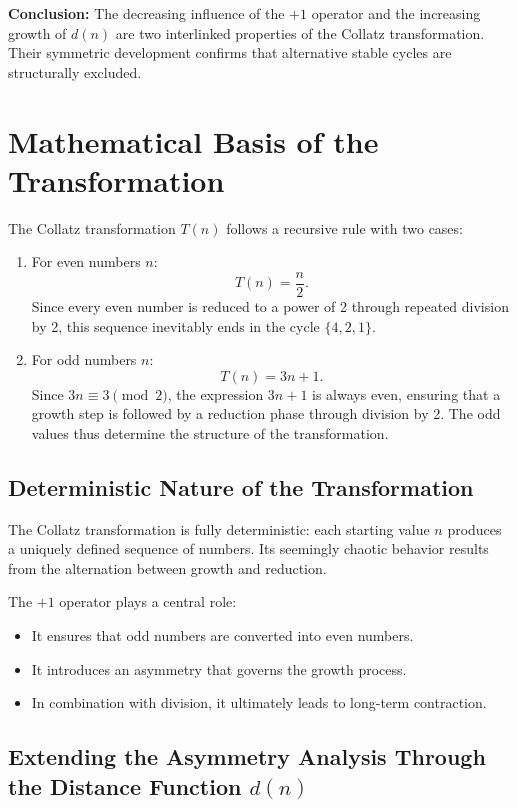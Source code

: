 \documentclass[a4paper,12pt]{article}
\begin{document}
\textbf{Conclusion:} The decreasing influence of the \( +1 \) operator and the increasing growth of \( d(n) \) are two interlinked properties of the Collatz transformation. Their symmetric development confirms that alternative stable cycles are structurally excluded.



\section{Mathematical Basis of the Transformation}

The Collatz transformation \( T(n) \) follows a recursive rule with two cases:
\begin{enumerate}
    \item For even numbers \( n \):
    \[
    T(n) = \frac{n}{2}.
    \]
    Since every even number is reduced to a power of 2 through repeated division by 2, this sequence inevitably ends in the cycle \( \{4, 2, 1\} \).
    
    \item For odd numbers \( n \):
    \[
    T(n) = 3n + 1.
    \]
    Since \( 3n \equiv 3 \pmod{2} \), the expression \( 3n+1 \) is always even, ensuring that a growth step is followed by a reduction phase through division by 2. The odd values thus determine the structure of the transformation.
\end{enumerate}

\subsection{Deterministic Nature of the Transformation}

The Collatz transformation is fully deterministic: each starting value \( n \) produces a uniquely defined sequence of numbers. Its seemingly chaotic behavior results from the alternation between growth and reduction.

The \( +1 \) operator plays a central role:
\begin{itemize}
    \item It ensures that odd numbers are converted into even numbers.
    \item It introduces an asymmetry that governs the growth process.
    \item In combination with division, it ultimately leads to long-term contraction.
\end{itemize}

\subsection{Extending the Asymmetry Analysis Through the Distance Function \( d(n) \)}
\end{document}
